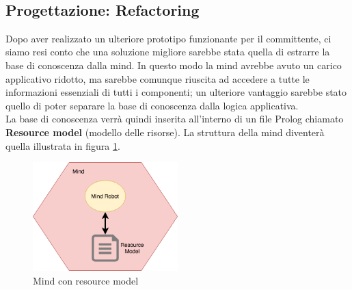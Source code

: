 \documentclass{llncs}
\begin{document}
\vspace*{1ex}
\\
\pagebreak

\subsection{Progettazione: Refactoring}
\label{ProgettazioneRefReq4}
Dopo aver realizzato un ulteriore prototipo funzionante per il committente, ci siamo resi conto che una soluzione migliore sarebbe stata quella di estrarre la base di conoscenza dalla mind. In questo modo la mind avrebbe avuto un carico applicativo ridotto, ma sarebbe comunque riuscita ad accedere a tutte le informazioni essenziali di tutti i componenti; un ulteriore vantaggio sarebbe stato quello di poter separare la base di conoscenza dalla logica applicativa.\\
La base di conoscenza verr\`a quindi inserita all'interno di un file Prolog chiamato \textbf{Resource model} (modello delle risorse). La struttura della mind diventer\`a quella illustrata in figura \hyperref[fig:MindRMReq4]{\ref{fig:MindRMReq4}}.\\
\begin{figure}
    \centering
    \includegraphics[width=0.5\textwidth]{Immagini/Requisito4/MindWithResourceModel.png}
    \caption{Mind con resource model}
    \label{fig:MindRMReq4}
\end{figure}
\vspace*{1ex}
\\
\end{document}
